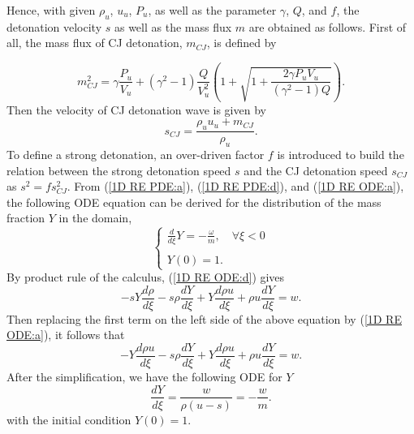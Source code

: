 \documentclass[preprint,12pt]{elsarticle}
\begin{document}
Hence, with given $\rho_u$, $u_u$, $P_u$, as well
as the parameter $\gamma$, $Q$, and $f$, the detonation velocity $s$ as well as
the mass flux $m$ are obtained as follows. First of all, the mass flux of CJ
detonation, $m_{CJ}$, is defined by

\begin{equation}
  m_{CJ}^2 = \gamma\frac{P_u}{V_u} + (\gamma^2 - 1)\frac{Q}{V_u^2}\left (1 +
    \sqrt{1 + \frac{2\gamma P_uV_u}{(\gamma^2 - 1)Q}}\right ).
\end{equation}
Then the velocity of CJ detonation wave is given by
\begin{equation}
  s_{CJ} = \frac{\rho_u u_u+ m_{CJ}}{\rho_u}.
\end{equation}
To define a strong detonation, an over-driven factor $f$ is introduced to build
the relation between the strong detonation speed $s$ and the CJ detonation speed
$s_{CJ}$ as $s^2=fs_{CJ}^2$. From (\ref{1D RE PDE:a}), (\ref{1D RE PDE:d}), and (\ref{1D RE ODE:a}), the
following ODE
equation can be derived for the distribution of the mass fraction $Y$ in the
domain,
\begin{equation}\label{ODE4Y}
  \left \{ \begin{array}{l}
    \displaystyle\frac{d}{d\xi}Y = - \frac{\omega}{m},\quad \forall \xi<0\\
    \\
    Y(0) = 1.
  \end{array}\right .
\end{equation}
By product rule of the calculus, (\ref{1D RE ODE:d}) gives 
\begin{equation}
  -sY\frac{d\rho}{d\xi} - s\rho\frac{dY}{d\xi} + Y\frac{d\rho u}{d \xi} + \rho
  u\frac{dY}{d\xi} = w.
\end{equation}
Then replacing the first term on the left side of the above equation by (\ref{1D RE ODE:a}), it follows that
\begin{equation}
  -Y\frac{d\rho u}{d\xi} - s\rho\frac{dY}{d\xi} + Y\frac{d\rho u}{d \xi} + \rho
  u\frac{dY}{d\xi} = w.
\end{equation}
After the simplification, we have the following ODE for $Y$
\begin{equation}
    \frac{dY}{d\xi} = \frac{w}{\rho(u - s)} = -\frac{w}{m}.
\end{equation}
with the initial condition $Y(0) = 1$.
\end{document}
